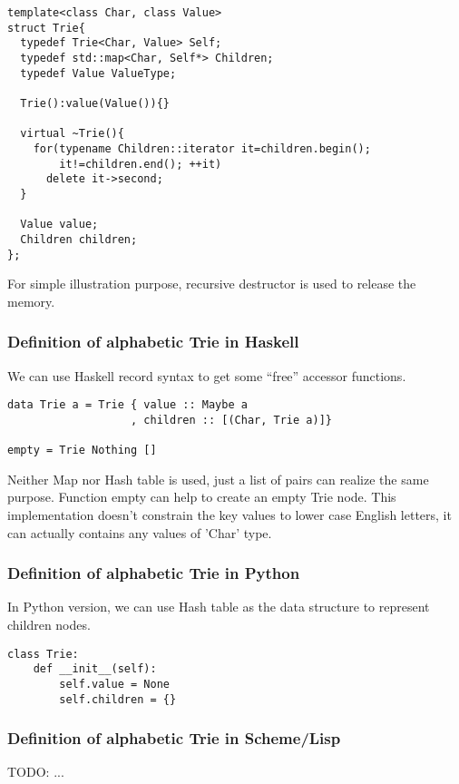 \documentclass{article}
\begin{document}
\lstset{language=C++}
\begin{lstlisting}
template<class Char, class Value>
struct Trie{
  typedef Trie<Char, Value> Self;
  typedef std::map<Char, Self*> Children;
  typedef Value ValueType;

  Trie():value(Value()){}

  virtual ~Trie(){
    for(typename Children::iterator it=children.begin();
        it!=children.end(); ++it)
      delete it->second;
  }

  Value value;
  Children children;
};
\end{lstlisting}

For simple illustration purpose, recursive destructor is used to
release the memory.

\subsubsection*{Definition of alphabetic Trie in Haskell}
We can use Haskell record syntax to get some ``free'' accessor
functions\cite{wiki-trie}. 

\lstset{language=Haskell}
\begin{lstlisting}
data Trie a = Trie { value :: Maybe a
                   , children :: [(Char, Trie a)]}

empty = Trie Nothing []
\end{lstlisting}

Neither Map nor Hash table is used, just a list of pairs can realize
the same purpose. Function empty can help to create an empty Trie
node. This implementation doesn't constrain the key values to lower
case English letters, it can actually contains any values of 'Char' type.

\subsubsection*{Definition of alphabetic Trie in Python}
In Python version, we can use Hash table as the data structure to
represent children nodes.

\lstset{language=Python}
\begin{lstlisting}
class Trie:
    def __init__(self):
        self.value = None
        self.children = {}
\end{lstlisting}

\subsubsection*{Definition of alphabetic Trie in Scheme/Lisp}
TODO: ...
\end{document}
